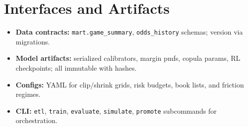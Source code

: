 \section{Interfaces and Artifacts}
\begin{itemize}
  \item \textbf{Data contracts:} \texttt{mart.game\_summary}, \texttt{odds\_history} schemas; version via migrations.
  \item \textbf{Model artifacts:} serialized calibrators, margin pmfs, copula params, RL checkpoints; all immutable with hashes.
  \item \textbf{Configs:} YAML for clip/shrink grids, risk budgets, book lists, and friction regimes.
  \item \textbf{CLI:} \texttt{etl}, \texttt{train}, \texttt{evaluate}, \texttt{simulate}, \texttt{promote} subcommands for orchestration.
\end{itemize}
